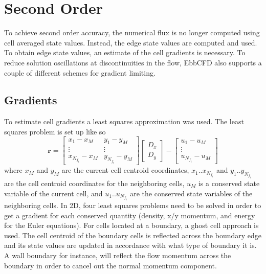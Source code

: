 \documentclass[12pt,parskip=full]{article}
\numberwithin{subsection}{section}
\begin{document}
	\section{Second Order}
		To achieve second order accuracy, the numerical flux is no longer computed using cell averaged state values.
		Instead, the edge state values are computed and used. To obtain edge state values, an estimate of the cell gradients 
		is necessary. To reduce solution oscillations at discontinuities in the flow, EbbCFD also supports a couple of
		different schemes for gradient limiting.

		\subsection{Gradients}
			To estimate cell gradients a least squares approximation was used. The least squares problem is set up like so
			\begin{equation}
				\mathbf{r} = \begin{bmatrix} x_1 - x_M & y_1 - y_M \\ \vdots & \vdots \\ x_{N_{f_i}} - x_M & y_{N_{f_i}} - y_M \end{bmatrix} \begin{bmatrix}D_x \\ D_y \end{bmatrix} - \begin{bmatrix} u_1 - u_M \\ \vdots \\ u_{N_{f_i}} - u_M \end{bmatrix}
			\end{equation}
			where $x_M$ and $y_M$ are the current cell centroid coordinates, $x_1..x_{N_{f_i}}$ and $y_1..y_{N_{f_i}}$ 
			are the cell centroid coordinates for the neighboring cells, $u_M$ is a conserved state variable of the current 
			cell, and $u_1..u_{N_{f_i}}$ are the conserved state variables of the neighboring cells. In 2D, four
			least squares problems need to be solved in order to get a gradient for each conserved quantity (density,
			x/y momentum, and energy for the Euler equations). For cells located at a boundary, a ghost cell approach is
			used. The cell centroid of the boundary cells is reflected across the boundary edge and its state values
			are updated in accordance with what type of boundary it is. A wall boundary for instance, will reflect the
			flow momentum across the boundary in order to cancel out the normal momentum component.
\end{document}
